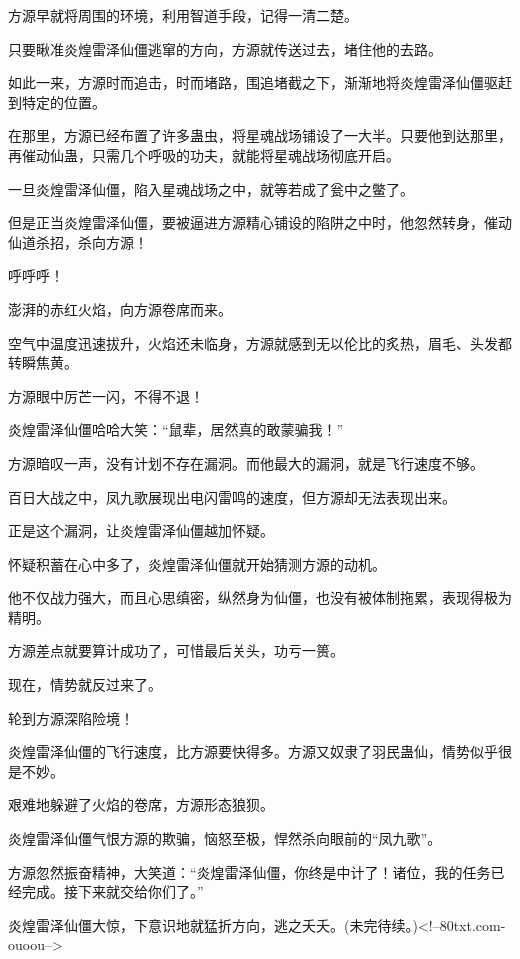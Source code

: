 \begin{this_body}
方源早就将周围的环境，利用智道手段，记得一清二楚。

只要瞅准炎煌雷泽仙僵逃窜的方向，方源就传送过去，堵住他的去路。

如此一来，方源时而追击，时而堵路，围追堵截之下，渐渐地将炎煌雷泽仙僵驱赶到特定的位置。

在那里，方源已经布置了许多蛊虫，将星魂战场铺设了一大半。只要他到达那里，再催动仙蛊，只需几个呼吸的功夫，就能将星魂战场彻底开启。

一旦炎煌雷泽仙僵，陷入星魂战场之中，就等若成了瓮中之鳖了。

但是正当炎煌雷泽仙僵，要被逼进方源精心铺设的陷阱之中时，他忽然转身，催动仙道杀招，杀向方源！

呼呼呼！

澎湃的赤红火焰，向方源卷席而来。

空气中温度迅速拔升，火焰还未临身，方源就感到无以伦比的炙热，眉毛、头发都转瞬焦黄。

方源眼中厉芒一闪，不得不退！

炎煌雷泽仙僵哈哈大笑：“鼠辈，居然真的敢蒙骗我！”

方源暗叹一声，没有计划不存在漏洞。而他最大的漏洞，就是飞行速度不够。

百日大战之中，凤九歌展现出电闪雷鸣的速度，但方源却无法表现出来。

正是这个漏洞，让炎煌雷泽仙僵越加怀疑。

怀疑积蓄在心中多了，炎煌雷泽仙僵就开始猜测方源的动机。

他不仅战力强大，而且心思缜密，纵然身为仙僵，也没有被体制拖累，表现得极为精明。

方源差点就要算计成功了，可惜最后关头，功亏一篑。

现在，情势就反过来了。

轮到方源深陷险境！

炎煌雷泽仙僵的飞行速度，比方源要快得多。方源又奴隶了羽民蛊仙，情势似乎很是不妙。

艰难地躲避了火焰的卷席，方源形态狼狈。

炎煌雷泽仙僵气恨方源的欺骗，恼怒至极，悍然杀向眼前的“凤九歌”。

方源忽然振奋精神，大笑道：“炎煌雷泽仙僵，你终是中计了！诸位，我的任务已经完成。接下来就交给你们了。”

炎煌雷泽仙僵大惊，下意识地就猛折方向，逃之夭夭。(未完待续。)<!--80txt.com-ouoou-->

\end{this_body}

